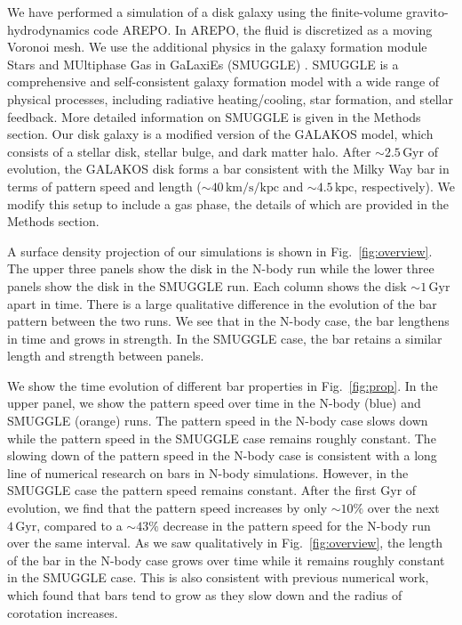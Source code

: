 \documentclass{natureprintstyle}
\begin{document}
We have performed a simulation of a disk galaxy using the finite-volume
gravito-hydrodynamics code AREPO.\cite{2010MNRAS.401..791S} In AREPO, the
fluid is discretized as a moving Voronoi mesh. We use the additional physics
in the galaxy formation module Stars and MUltiphase Gas in GaLaxiEs (SMUGGLE)
\cite{2019MNRAS.489.4233M}. SMUGGLE is a comprehensive and self-consistent
galaxy formation model with a wide range of physical processes, including
radiative heating/cooling, star formation, and stellar feedback. More detailed
information on SMUGGLE is given in the Methods section. Our disk galaxy is a
modified version of the GALAKOS model\cite{2020ApJ...890..117D}, which
consists of a stellar disk, stellar bulge, and dark matter halo. After
$\sim2.5\,\textrm{Gyr}$ of evolution, the GALAKOS disk forms a bar consistent
with the Milky Way bar in terms of pattern speed and length
($\sim40\,\textrm{km}/\textrm{s}/\textrm{kpc}$ and $\sim4.5\,\textrm{kpc}$,
respectively). We modify this setup to include a gas phase, the details of
which are provided in the Methods section.

A surface density projection of our simulations is shown in
Fig.~\ref{fig:overview}. The upper three panels show the disk in the N-body
run while the lower three panels show the disk in the SMUGGLE run. Each column
shows the disk $\sim1\,\textrm{Gyr}$ apart in time. There is a large
qualitative difference in the evolution of the bar pattern between the two
runs. We see that in the N-body case, the bar lengthens in time and grows in
strength. In the SMUGGLE case, the bar retains a similar length and strength
between panels.

We show the time evolution of different bar properties in Fig.~\ref{fig:prop}.
In the upper panel, we show the pattern speed over time in the N-body (blue)
and SMUGGLE (orange) runs. The pattern speed in the N-body case slows down
while the pattern speed in the SMUGGLE case remains roughly constant. The
slowing down of the pattern speed in the N-body case is consistent with a long
line of numerical research on bars in N-body
simulations.\cite{1992ApJ...400...80H, 2000ApJ...543..704D,
2002MNRAS.330...35A, 2002ApJ...569L..83A, 2003MNRAS.341.1179A,
2003MNRAS.346..251O, 2005MNRAS.363..991H, 2006ApJ...637..214M,
2007MNRAS.375..460W, 2009ApJ...697..293D} However, in the SMUGGLE case the
pattern speed remains constant. After the first Gyr of evolution, we find that
the pattern speed increases by only $\sim10\%$ over the next
$4\,\textrm{Gyr}$, compared to a $\sim43\%$ decrease in the pattern speed for
the N-body run over the same interval. As we saw qualitatively in
Fig.~\ref{fig:overview}, the length of the bar in the N-body case grows over
time while it remains roughly constant in the SMUGGLE case. This is also
consistent with previous numerical work, which found that bars tend to grow as
they slow down and the radius of corotation
increases.\cite{2000ApJ...543..704D, 2003MNRAS.341.1179A}
\end{document}
